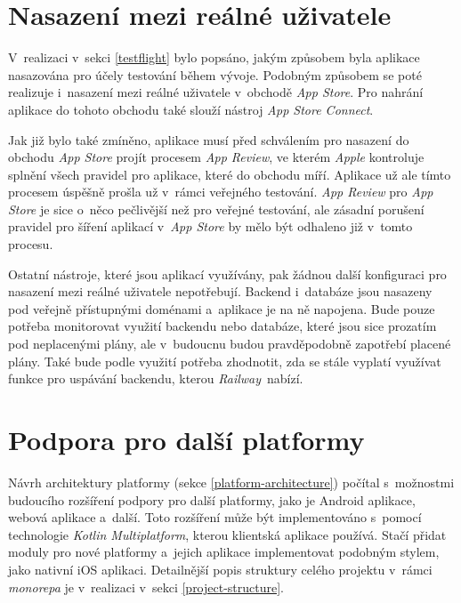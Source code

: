\section{Nasazení mezi reálné uživatele}

V~realizaci v~sekci \ref{testflight} bylo popsáno, jakým způsobem byla aplikace nasazována pro účely testování během vývoje. Podobným způsobem se poté realizuje i~nasazení mezi reálné uživatele v~obchodě \emph{App Store}. Pro nahrání aplikace do tohoto obchodu také slouží nástroj \emph{App Store Connect}.

Jak již bylo také zmíněno, aplikace musí před schválením pro nasazení do obchodu \emph{App Store} projít procesem \emph{App Review}, ve kterém \emph{Apple} kontroluje splnění všech pravidel pro aplikace, které do obchodu míří. Aplikace už ale tímto procesem úspěšně prošla už v~rámci veřejného testování. \emph{App Review} pro \emph{App Store} je sice o~něco pečlivější než pro veřejné testování, ale zásadní porušení pravidel pro šíření aplikací v~\emph{App Store} by mělo být odhaleno již v~tomto procesu.

Ostatní nástroje, které jsou aplikací využívány, pak žádnou další konfiguraci pro nasazení mezi reálné uživatele nepotřebují. Backend i~databáze jsou nasazeny pod veřejně přístupnými doménami a~aplikace je na ně napojena. Bude pouze potřeba monitorovat využití backendu nebo databáze, které jsou sice prozatím pod neplacenými plány, ale v~budoucnu budou pravděpodobně zapotřebí placené plány. Také bude podle využití potřeba zhodnotit, zda se stále vyplatí využívat funkce pro uspávání backendu, kterou \emph{Railway} nabízí.

\section{Podpora pro další platformy}

Návrh architektury platformy (sekce \ref{platform-architecture}) počítal s~možnostmi budoucího rozšíření podpory pro další platformy, jako je Android aplikace, webová aplikace a~další. Toto rozšíření může být implementováno s~pomocí technologie \emph{Kotlin Multiplatform}, kterou klientská aplikace používá. Stačí přidat moduly pro nové platformy a~jejich aplikace implementovat podobným stylem, jako nativní iOS aplikaci. Detailnější popis struktury celého projektu v~rámci \emph{monorepa} je v~realizaci v~sekci \ref{project-structure}.

